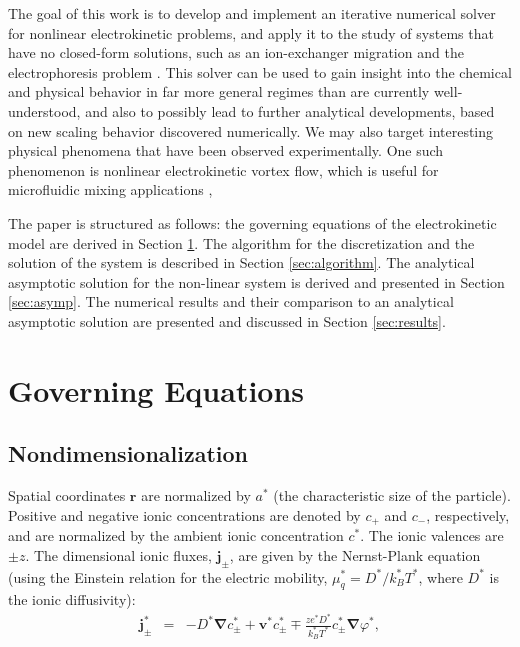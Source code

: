 \documentclass[10pt]{ijnam}
\newcommand\bnabla{\boldsymbol{\nabla}}
\newcommand\bv{\boldsymbol{v}}
\newcommand\bj{\boldsymbol{j}}
\newcommand\br{\boldsymbol{r}}
\begin{document}
The goal of this work is to develop and implement an iterative numerical
solver for nonlinear electrokinetic problems, and apply it to the study
of systems that have no closed-form solutions, such as an ion-exchanger migration
\cite{yariv2010migration} and the electrophoresis problem \cite{schnitzer2012surface}.
This solver can be used to gain insight into the chemical and physical behavior 
in far more general regimes than are currently well-understood, 
and also to possibly lead to further analytical developments, based on new scaling behavior
discovered numerically. We may also target interesting physical
phenomena that have been observed experimentally.
One such phenomenon is nonlinear electrokinetic vortex flow, 
which is useful for microfluidic mixing applications \cite{wang2004mix, ben2002vortex},

The paper is structured as follows: the governing equations of the electrokinetic model
are derived in Section \ref{sec:equations}. The algorithm for the discretization and 
the solution of the system is described in Section \ref{sec:algorithm}.
The analytical asymptotic solution for the non-linear system is derived 
and presented in Section \ref{sec:asymp}.
The numerical results and their comparison to an analytical asymptotic solution 
are presented and discussed in Section \ref{sec:results}. 

\section{Governing Equations} \label{sec:equations}

\subsection{Nondimensionalization}
Spatial coordinates $\br$ are normalized by $a^*$ 
(the characteristic size of the particle).
Positive and negative ionic concentrations are denoted by $c_+$ and $c_-$, respectively, and
are normalized by the ambient ionic concentration $c^*$. The ionic valences are $\pm z$.
The dimensional ionic fluxes, $\bj_\pm$, are given by the Nernst-Plank equation 
(using the Einstein relation for the electric mobility, $\mu_q^* = D^* / k_B^* T^*$, 
where $D^*$ is the ionic diffusivity):
\begin{eqnarray}
\bj^*_\pm &=& 
-D^* \bnabla c^*_\pm + \bv^* c^*_\pm \mp \frac{z e^* D^*}{k_B^* T^*} c^*_\pm \bnabla \varphi^*,
\end{eqnarray}
\end{document}
